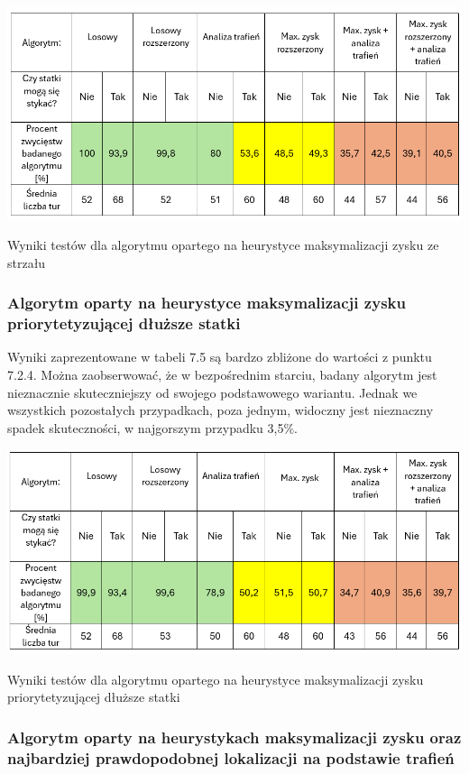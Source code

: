 \begin{table}[!h]
    \centering
    \includegraphics[width=1\linewidth]{img/table-location-heuristic.png}
    \caption{Wyniki testów dla algorytmu opartego na heurystyce maksymalizacji zysku ze strzału}
\end{table}


\subsubsection{Algorytm oparty na heurystyce maksymalizacji zysku priorytetyzującej dłuższe statki}

Wyniki zaprezentowane w tabeli 7.5 są bardzo zbliżone do wartości z punktu 7.2.4. Można zaobserwować, że w bezpośrednim starciu, badany algorytm jest nieznacznie skuteczniejszy od swojego podstawowego wariantu. Jednak we wszystkich pozostałych przypadkach, poza jednym, widoczny jest nieznaczny spadek skuteczności, w najgorszym przypadku 3,5\%.

\begin{table}[!h]
    \centering
    \includegraphics[width=1\linewidth]{img/table-location-heuristic-extended.png}
    \caption{Wyniki testów dla algorytmu opartego na heurystyce maksymalizacji zysku priorytetyzującej dłuższe statki}
\end{table}

\subsubsection{Algorytm oparty na heurystykach maksymalizacji zysku oraz najbardziej prawdopodobnej lokalizacji na podstawie trafień}

